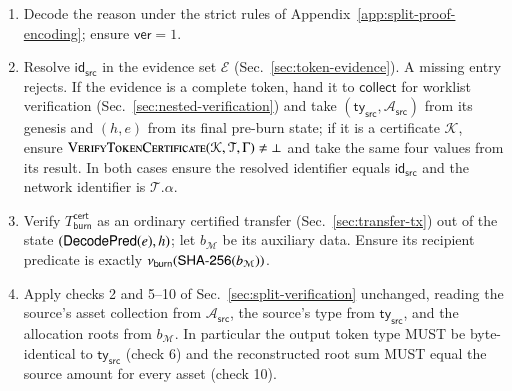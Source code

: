 \begin{enumerate}
	\item Decode the reason under the strict rules of Appendix~\ref{app:split-proof-encoding}; ensure $\mathsf{ver} = 1$.
	\item Resolve $\mathsf{id}_\mathsf{src}$ in the evidence set $\mathcal{E}$ (Sec.~\ref{sec:token-evidence}). A missing entry rejects. If the evidence is a complete token, hand it to $\mathsf{collect}$ for worklist verification (Sec.~\ref{sec:nested-verification}) and take $(\mathsf{ty}_\mathsf{src}, \mathcal{A}_\mathsf{src})$ from its genesis and $(h,e)$ from its final pre-burn state; if it is a certificate $\mathcal{K}$, ensure $\Call{VerifyTokenCertificate}{\mathcal{K}, \mathcal{T}, \Gamma} \ne \bot$ and take the same four values from its result. In both cases ensure the resolved identifier equals $\mathsf{id}_\mathsf{src}$ and the network identifier is $\mathcal{T}.\alpha$.
	\item Verify $T_\mathsf{burn}^\mathsf{cert}$ as an ordinary certified transfer (Sec.~\ref{sec:transfer-tx}) out of the state $(\mathsf{DecodePred}(e), h)$; let $b_\mathcal{M}$ be its auxiliary data. Ensure its recipient predicate is exactly $\nu_\mathsf{burn}(\mathsf{SHA\text{-}256}(b_\mathcal{M}))$.
	\item Apply checks 2 and 5--10 of Sec.~\ref{sec:split-verification} unchanged, reading the source's asset collection from $\mathcal{A}_\mathsf{src}$, the source's type from $\mathsf{ty}_\mathsf{src}$, and the allocation roots from $b_\mathcal{M}$. In particular the output token type MUST be byte-identical to $\mathsf{ty}_\mathsf{src}$ (check 6) and the reconstructed root sum MUST equal the source amount for every asset (check 10).
\end{enumerate}

